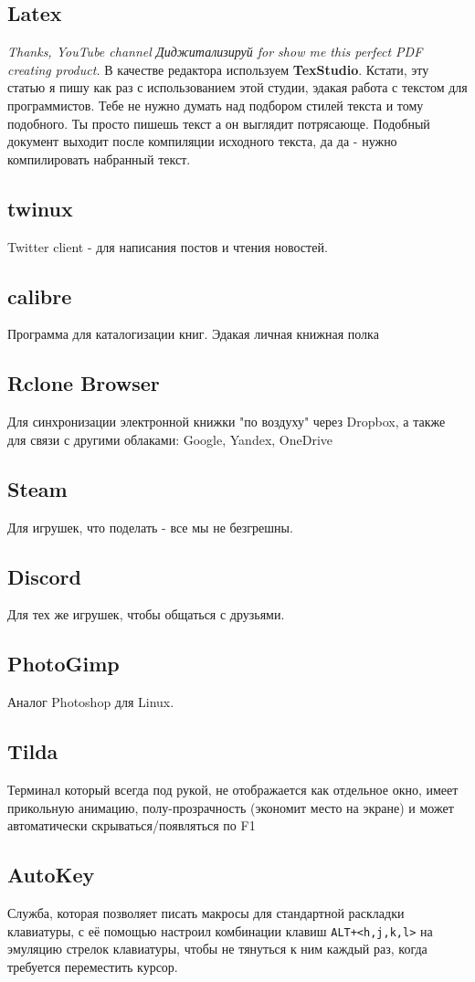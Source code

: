 \documentclass[a4paper, 12pt]{report}
\begin{document}
\subsection{Latex}
\textit{Thanks, YouTube channel Диджитализируй for show me this perfect PDF creating product.}
В качестве редактора используем \textbf{TexStudio}. Кстати, эту статью я пишу как раз с использованием этой студии, эдакая работа с текстом для программистов. Тебе не нужно думать над подбором стилей текста и тому подобного. Ты просто пишешь текст а он выглядит потрясающе. Подобный документ выходит после компиляции исходного текста, да да - нужно компилировать набранный текст.

\subsection{twinux} Twitter client - для написания постов и чтения новостей.
\subsection{calibre} Программа для каталогизации книг. Эдакая личная книжная полка
\subsection{Rclone Browser} Для синхронизации электронной книжки "по воздуху" через Dropbox, а также для связи с другими облаками: Google, Yandex, OneDrive
\subsection{Steam} Для игрушек, что поделать - все мы не безгрешны.
\subsection{Discord} Для тех же игрушек, чтобы общаться с друзьями.
\subsection{PhotoGimp} Аналог Photoshop для Linux.
\subsection{Tilda} Терминал который всегда под рукой, не отображается как отдельное окно, имеет прикольную анимацию, полу-прозрачность (экономит место на экране) и может автоматически скрываться/появляться по F1
\subsection{AutoKey} Служба, которая позволяет писать макросы для стандартной раскладки клавиатуры, с её помощью настроил комбинации клавиш \lstinline|ALT+<h,j,k,l>| на эмуляцию стрелок клавиатуры, чтобы не тянуться к ним каждый раз, когда требуется переместить курсор.
\end{document}

